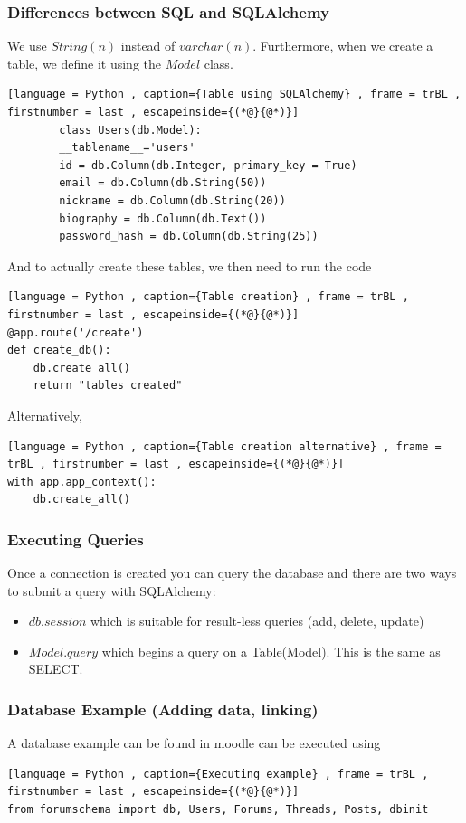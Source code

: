\documentclass[a4paper]{article}
\theoremstyle{plain}
\theoremstyle{definition}
\newtheorem{exmp}{Example}[section]
\theoremstyle{remark}
\begin{document}
\begin{flushleft}
\subsubsection{Differences between SQL and SQLAlchemy}
We use $String(n)$ instead of $varchar(n)$. Furthermore, when we create a table, we define it using the $Model$ class. 
\begin{tcolorbox}[colback=black!3!white,colframe=black!60!white,title=\begin{exmp}Table using SQLAlchemy \label{Table using SQLAlchemy}\end{exmp}]
        \begin{lstlisting}[language = Python , caption={Table using SQLAlchemy} , frame = trBL , firstnumber = last , escapeinside={(*@}{@*)}]
        class Users(db.Model):
		__tablename__='users'
		id = db.Column(db.Integer, primary_key = True)
		email = db.Column(db.String(50))
		nickname = db.Column(db.String(20))
		biography = db.Column(db.Text())
		password_hash = db.Column(db.String(25))
        \end{lstlisting}
\end{tcolorbox}
And to actually create these tables, we then need to run the code
\begin{lstlisting}[language = Python , caption={Table creation} , frame = trBL , firstnumber = last , escapeinside={(*@}{@*)}]
@app.route('/create')
def create_db():
	db.create_all()
	return "tables created"
\end{lstlisting}
Alternatively,
\begin{lstlisting}[language = Python , caption={Table creation alternative} , frame = trBL , firstnumber = last , escapeinside={(*@}{@*)}]
with app.app_context():
	db.create_all()
\end{lstlisting}
\subsubsection{Executing Queries}
Once a connection is created you can query the database and there are two ways to submit a query with SQLAlchemy:
\begin{itemize}
	\item $db.session$ which is suitable for result-less queries (add, delete, update)
	\item $Model.query$ which begins a query on a Table(Model). This is the same as SELECT.
\end{itemize}
\subsubsection{Database Example (Adding data, linking)}
A database example can be found in moodle can be executed using
\begin{lstlisting}[language = Python , caption={Executing example} , frame = trBL , firstnumber = last , escapeinside={(*@}{@*)}]
from forumschema import db, Users, Forums, Threads, Posts, dbinit


\end{lstlisting}
\end{flushleft}
\end{document}
